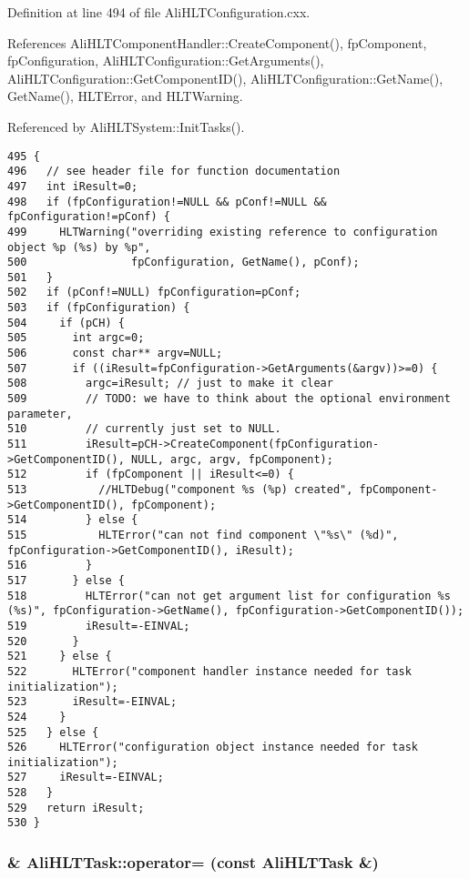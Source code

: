 Definition at line 494 of file Ali\-HLTConfiguration.cxx.

References Ali\-HLTComponent\-Handler::Create\-Component(), fp\-Component, fp\-Configuration, Ali\-HLTConfiguration::Get\-Arguments(), Ali\-HLTConfiguration::Get\-Component\-ID(), Ali\-HLTConfiguration::Get\-Name(), Get\-Name(), HLTError, and HLTWarning.

Referenced by Ali\-HLTSystem::Init\-Tasks().

\footnotesize\begin{verbatim}495 {
496   // see header file for function documentation
497   int iResult=0;
498   if (fpConfiguration!=NULL && pConf!=NULL && fpConfiguration!=pConf) {
499     HLTWarning("overriding existing reference to configuration object %p (%s) by %p",
500                fpConfiguration, GetName(), pConf);
501   }
502   if (pConf!=NULL) fpConfiguration=pConf;
503   if (fpConfiguration) {
504     if (pCH) {
505       int argc=0;
506       const char** argv=NULL;
507       if ((iResult=fpConfiguration->GetArguments(&argv))>=0) {
508         argc=iResult; // just to make it clear
509         // TODO: we have to think about the optional environment parameter,
510         // currently just set to NULL. 
511         iResult=pCH->CreateComponent(fpConfiguration->GetComponentID(), NULL, argc, argv, fpComponent);
512         if (fpComponent || iResult<=0) {
513           //HLTDebug("component %s (%p) created", fpComponent->GetComponentID(), fpComponent); 
514         } else {
515           HLTError("can not find component \"%s\" (%d)", fpConfiguration->GetComponentID(), iResult);
516         }
517       } else {
518         HLTError("can not get argument list for configuration %s (%s)", fpConfiguration->GetName(), fpConfiguration->GetComponentID());
519         iResult=-EINVAL;
520       }
521     } else {
522       HLTError("component handler instance needed for task initialization");
523       iResult=-EINVAL;
524     }
525   } else {
526     HLTError("configuration object instance needed for task initialization");
527     iResult=-EINVAL;
528   }
529   return iResult;
530 }
\end{verbatim}\normalsize 


\subsubsection{ \& Ali\-HLTTask::operator= (const {\bf Ali\-HLTTask} \&)}\label{classAliHLTTask_a3}


